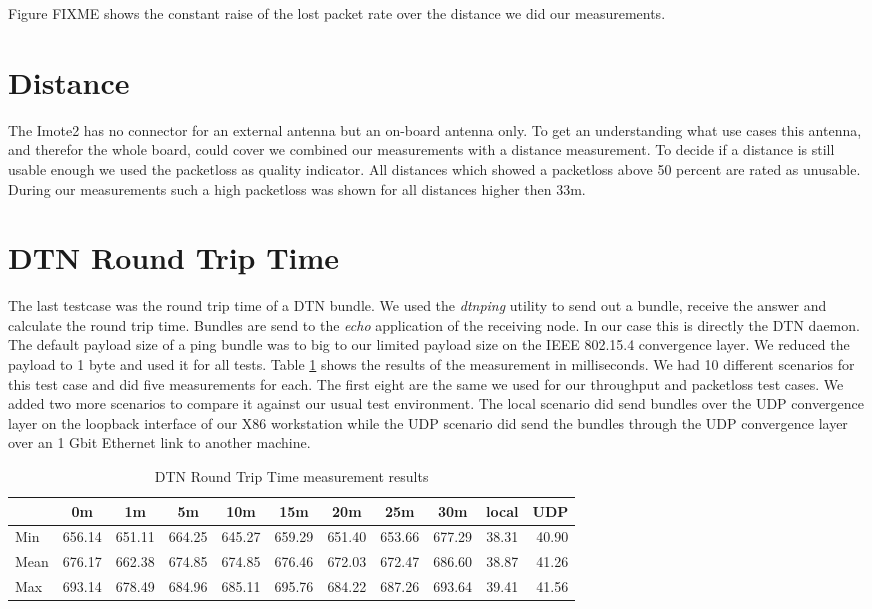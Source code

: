 Figure FIXME shows the constant raise of the lost packet rate over the distance
we did our measurements.

\section{Distance}
The Imote2 has no connector for an external antenna but an on-board antenna
only. To get an understanding what use cases this antenna, and therefor the
whole board, could cover we combined our measurements with a distance
measurement. To decide if a distance is still usable enough we used the
packetloss as quality indicator. All distances which showed a packetloss above
50 percent are rated as unusable. During our measurements such a high packetloss
was shown for all distances higher then 33m.

\section{DTN Round Trip Time}
The last testcase was the round trip time of a DTN bundle. We used the
\emph{dtnping} utility to send out a bundle, receive the answer and calculate
the round trip time. Bundles are send to the \emph{echo} application of the
receiving node. In our case this is directly the DTN daemon. The default payload
size of a ping bundle was to big to our limited payload size on the IEEE
802.15.4 convergence layer. We reduced the payload to 1 byte and used it for all
tests. Table \ref{dtnrtt} shows the results of the measurement in milliseconds. We
had 10 different scenarios for this test case and did five measurements for each.
The first eight are the same we used for our throughput and packetloss test cases.
We added two more scenarios to compare it against our usual test environment. The
local scenario did send bundles over the UDP convergence layer on the loopback
interface of our X86 workstation while the UDP scenario did send the bundles
through the UDP convergence layer over an 1 Gbit Ethernet link to another
machine.

\begin{table}
\begin{tabular}{l*{9}{c}r}
    & 0m & 1m & 5m & 10m & 15m & 20m & 25m & 30m & local & UDP \\
\hline
Min & 656.14 & 651.11 & 664.25 & 645.27 & 659.29 & 651.40 & 653.66 & 677.29 & 38.31 & 40.90 \\
Mean & 676.17 & 662.38 & 674.85 & 674.85 & 676.46 & 672.03 & 672.47 & 686.60 & 38.87 & 41.26 \\
Max & 693.14 & 678.49 & 684.96 & 685.11 & 695.76 & 684.22 & 687.26 & 693.64 & 39.41 & 41.56 \\
\end{tabular}
\caption{ DTN Round Trip Time measurement results}
\label{dtnrtt}
\end{table}
